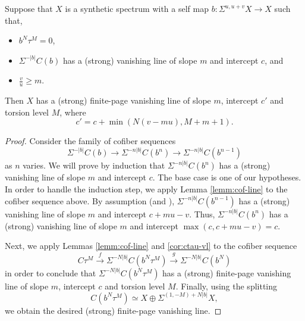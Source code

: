 \begin{lem}
  \label{lemm:syn-lines}
  Suppose that $X$ is a synthetic spectrum with a self map
  $b: \Sigma^{u,u+v}X \to X$ such that,
  \begin{itemize}
  \item $b^N\tau^M = 0$,
  \item $\Sigma^{-|b|} C(b)$ has a (strong) vanishing line of slope $m$ and intercept $c$, and
  \item $ \frac{v}{u} \geq m$.
  \end{itemize}
  Then $X$ has a (strong) finite-page vanishing line of slope $m$, intercept $c'$ and torsion level $M$, where
  $$ c' = c + \min(N(v-mu), M+m+1). $$
\end{lem}

\begin{proof}

  Consider the family of cofiber sequences
  $$ \Sigma^{-|b|} C(b) \to \Sigma^{-n|b|} C(b^n) \to \Sigma^{-n|b|} C(b^{n-1}) $$
  as $n$ varies. We will prove by induction that $\Sigma^{-n|b|} C(b^n)$ has a (strong) vanishing line of slope $m$ and intercept $c$. The base case is one of our hypotheses. In order to handle the induction step, we apply Lemma \ref{lemm:cof-line} to the cofiber sequence above. By assumption (and ), $\Sigma^{-n|b|} C(b^{n-1})$ has a (strong) vanishing line of slope $m$ and intercept $c + mu - v$. Thus, $\Sigma^{-n|b|} C(b^n)$ has a (strong) vanishing line of slope $m$ and intercept $\max(c, c + mu-v) = c$.
  
  Next, we apply Lemmas \ref{lemm:cof-line} and \ref{cor:ctau-vl} to the cofiber sequence 
  $$ C\tau^M \xrightarrow{f} \Sigma^{-N|b|} C(b^N\tau^M) \xrightarrow{g} \Sigma^{-N|b|} C(b^N) $$
  in order to conclude that $\Sigma^{-N|b|} C(b^N\tau^M)$ has a (strong) finite-page vanishing line of slope $m$, intercept $c$ and torsion level $M$. Finally, using the splitting
  $$ C(b^N\tau^M) \simeq X \oplus \Sigma^{(1,-M) + N|b|}X, $$
  we obtain the desired (strong) finite-page vanishing line. \qedhere
  

\end{proof}


